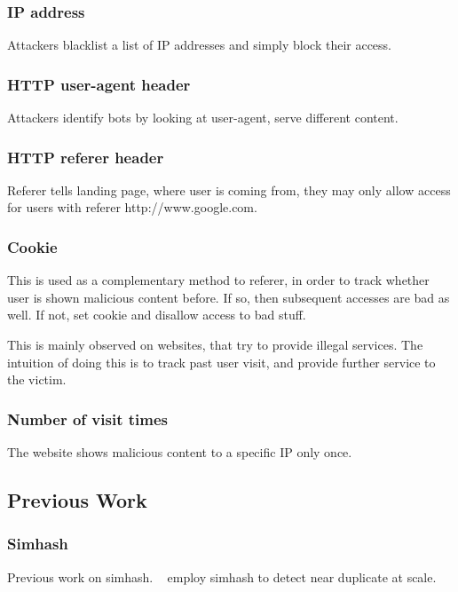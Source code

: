 \subsubsection{IP address}
Attackers blacklist a list of IP addresses and simply block their access.
\subsubsection{HTTP user-agent header}
Attackers identify bots by looking at user-agent, serve different content.
\subsubsection{HTTP referer header}
Referer tells landing page, where user is coming from, they may only allow
access for users with referer http://www.google.com.
\subsubsection{Cookie}
This is used as a complementary method to referer, in order to track whether
user is shown malicious content before. If so, then subsequent accesses are
bad as well. If not, set cookie and disallow access to bad stuff.

This is mainly observed on websites, that try to provide illegal services. The
intuition of doing this is to track past user visit, and provide further service
to the victim.
\subsubsection{Number of visit times}
The website shows malicious content to a specific IP only once.

\subsection{Previous Work}
\subsubsection{Simhash}

Previous work on simhash. ~\cite{manku2007detecting} employ simhash to detect
near duplicate at scale.

